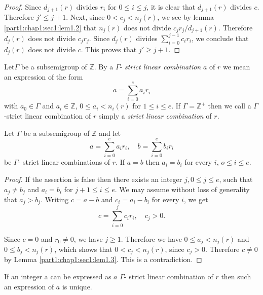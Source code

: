 \begin{proof}
  Since $d_{j+1}(r)$ divides $r_i$ for $0 \leq i \leq j$, it is clear that $d_{j+1} (r)$ divides $c$. Therefore $j' \leq j +1$. Next, since $0 < c_j < n_j (r)$, we see by lemma \ref{part1:chap1:sec1:lem1.2} that $n_j (r)$ does not divide $c_j r_j/ d_{j+1} (r)$. Therefore $d_j (r)$ does not divide $c_j r_j$. Since $d_j (r)$ divides $\displaystyle{\sum^{j-1}_{i=0}}c_i r_i$, we conclude that $d_j (r)$ does not divide $c$. This proves that $j' \geq j + 1$.
\end{proof}

\begin{defi}\label{part1:chap1:sec1:def1.4}
  Let\pageoriginale $\Gamma$ be a subsemigroup of $\mathbb{Z}$. By a $\Gamma$- \textit{strict linear combination} $a$ of $r$ we mean an expression of the form
$$
  a = \sum_{i=0}^e a_i r_i
$$ 
with $a_0 \in \Gamma$ and $a_i \in \mathbb{Z}$, $0 \leq a_i < n_i (r)$ for $1 \leq i \leq e$. If $\Gamma = \mathbb{Z}^+$ then we call a $\Gamma$-strict linear combination of $r$ simply a \textit{strict linear combination} of $r$.
\end{defi}

\begin{prop} \label{part1:chap1:sec1:prop1.5}
  Let $\Gamma$ be a subsemigroup of $\mathbb{Z}$ and let 
  $$
  a = \sum^e_{i=0} a_i r_i, \quad b= \sum_{i=0}^e b_i r_i
  $$
  be $\Gamma$- strict linear combinations of $r$. If $a=b$ then $a_i = b_i$ for every $i$, $o \leq i \leq e$.
\end{prop}

\begin{proof}
  If the assertion is false then there exists an integer $j, 0 \leq j \leq e$, such that $a_j \neq b_j$ and $a_i = b_i$ for $j+1 \leq i \leq e$. We may assume without loss of generality that $a_j > b_j$. Writing $c=a-b$ and $c_i = a_i - b_i$ for every $i$, we get
  $$
  c= \sum^j_{i=0} c_i r_i, \quad c_j > 0.
  $$

Since $c=0$ and $r_0 \neq 0$, we have $j \geq 1$. Therefore we have $0 \leq a_j < n_j (r)$ and $0 \leq b_j < n_j (r)$, which shows that $0 < c_j < n_j (r)$, since $c_j > 0$. Therefore $c \neq 0$ by Lemma \ref{part1:chap1:sec1:lem1.3}. This is a contradiction.
\end{proof}

\begin{coro}\label{part1:chap1:sec1:coro1.6}
  If an integer a can be expressed as $a$ $\Gamma$- strict linear combination of $r$ then such an expression of $a$ is unique.
\end{coro}
 
